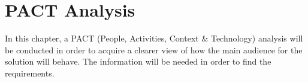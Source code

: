 





\chapter{PACT Analysis}
In this chapter, a PACT (People, Activities, Context \& Technology) analysis will be conducted in order to acquire a clearer view of how the main audience for the solution will behave. The information will be needed in order to find the requirements.

